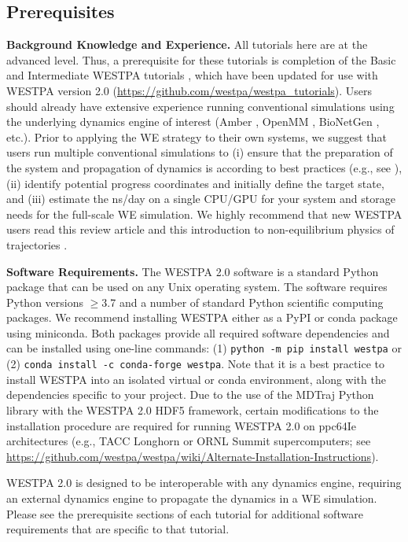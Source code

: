 \subsection{Prerequisites}

\textbf{Background Knowledge and Experience.} All tutorials here are at the advanced level. 
Thus, a prerequisite for these tutorials is completion of the Basic and Intermediate WESTPA tutorials \citep{bogetti_suite_2019}, which have been updated for use with WESTPA version 2.0 ({\url{https://github.com/westpa/westpa_tutorials}}). 
Users should already have extensive experience running conventional simulations using the underlying dynamics engine of interest (Amber \citep{case_amber_2022}, OpenMM \citep{eastman_openmm_2017}, BioNetGen \citep{harris_bionetgen_2016}, etc.). 
Prior to applying the WE strategy to their own systems, we suggest that users run multiple conventional simulations to (i) ensure that the preparation of the system and propagation of dynamics is according to best practices (e.g., see \citep{braun_best_2019}), (ii) identify potential progress coordinates and initially define the target state, and (iii) estimate the ns/day on a single CPU/GPU for your system and storage needs for the full-scale WE simulation. 
We highly recommend that new WESTPA users read this review article \citep{zuckerman_weighted_2017} and this introduction to non-equilibrium physics of trajectories \citep{zuckerman_gentle_2021}. 

\textbf{Software Requirements.} The WESTPA 2.0 software is a standard Python package that can be used on any Unix operating system. 
The software requires Python versions $\geq$3.7 and a number of standard Python scientific computing packages. 
We recommend installing WESTPA either as a PyPI or conda package using miniconda. 
Both packages provide all required software dependencies and can be installed using one-line commands: (1) \verb|python -m pip install westpa| or (2) \verb|conda install -c conda-forge westpa|. 
Note that it is a best practice to install WESTPA into an isolated virtual or conda environment, along with the dependencies specific to your project. 
Due to the use of the MDTraj Python library with the WESTPA 2.0 HDF5 framework, certain modifications to the installation procedure are required for running WESTPA 2.0 on ppc64Ie architectures (e.g., TACC Longhorn or ORNL Summit supercomputers; see {\url{https://github.com/westpa/westpa/wiki/Alternate-Installation-Instructions}}). 

WESTPA 2.0 is designed to be interoperable with any dynamics engine, requiring an external dynamics engine to propagate the dynamics in a WE simulation.
Please see the prerequisite sections of each tutorial for additional software requirements that are specific to that tutorial.

